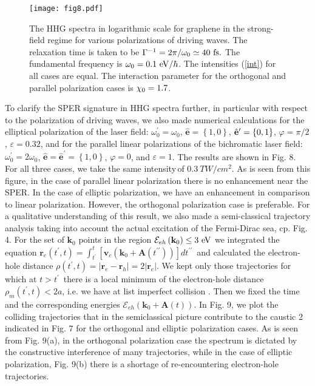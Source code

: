 \documentclass[reprint, superscriptaddress,  aps, pra]{revtex4-2}
\begin{document}
\begin{figure}[tbp]
\texttt{[image: fig8.pdf]}
\caption{The HHG spectra in logarithmic scale for graphene in the
strong-field regime for various polarizations of driving waves. The
relaxation time is taken to be $\Gamma ^{-1}=2\protect\pi /\protect\omega %
_{0}\simeq 40\ \mathrm{fs.}$ The fundamental frequency is $\protect\omega %
_{0}=0.1\ \mathrm{eV}/\hbar $. The intensities (\protect\ref{int}) for all
cases are equal. The interaction parameter for the orthogonal and parallel
polarization cases is $\protect\chi _{0}=1.7$. }
\end{figure}
To clarify the SPER signature in HHG spectra further, in particular with
respect to the polarization of driving waves, we also made numerical
calculations for the elliptical polarization of the laser field: $\omega
_{0}^{\prime }=\omega _{0}$, $\hat{\mathbf{e}}=\left\{ 1,0\right\} $, $\hat{%
\mathbf{e}}^{\prime }=\left\{ 0,1\right\} $, $\varphi =\pi /2$, $\varepsilon
=0.32$, and for the parallel linear polarizations of the bichromatic laser
field: $\omega _{0}^{\prime }=2\omega _{0}$, $\hat{\mathbf{e}}=\hat{\mathbf{e%
}}^{\prime }=\left\{ 1,0\right\} $, $\varphi =0$, and $\varepsilon =1$. The
results are shown in Fig. 8. For all three cases, we take the same intensity$%
\,$of \allowbreak $0.3\ TW/cm^{2}$. As is seen from this figure, in the case
of parallel linear polarization there is no enhancement near the SPER. In
the case of elliptic polarization, we have an enhancement in comparison to
linear polarization. However, the orthogonal polarization case is
preferable. For a qualitative understanding of this result, we also made a
semi-classical trajectory analysis taking into account the actual excitation
of the Fermi-Dirac sea, cp. Fig. 4. For the set of $\mathbf{k}_{0}$ points
in the region $\mathcal{E}_{eh}\left( \mathbf{k}_{0}\right) \leq 3\ \mathrm{%
eV}$ we integrated the equation $\mathbf{r}_{e}\left( t^{\prime },t\right)
=\int_{t^{\prime }}^{t}\left[ \mathbf{v}_{c}\left( \mathbf{k}_{0}+\mathbf{A}%
\left( t^{\prime \prime }\right) \right) \right] dt^{\prime \prime }$\ and
calculated the electron-hole distance $\rho \left( t^{\prime },t\right)
=\left\vert \mathbf{r}_{e}-\mathbf{r}_{h}\right\vert =2\left\vert \mathbf{r}%
_{e}\right\vert $. We kept only those trajectories for which at $t>t^{\prime
}$\ there is a local minimum of the electron-hole distance $\rho _{m}\left(
t^{\prime },t\right) <2a$, i.e. we have at list imperfect collision \cite%
{Gaarde}. Then we fixed the time and the corresponding energies $\mathcal{E}%
_{eh}\left( \mathbf{k}_{0}+\mathbf{A}\left( t\right) \right) $. In Fig. 9,
we plot the colliding trajectories that in the semiclassical picture
contribute to the caustic 2 indicated in Fig. 7 for the orthogonal and
elliptic polarization cases. As is seen from Fig. 9(a), in the orthogonal
polarization case the spectrum is dictated by the constructive interference
of many trajectories, while in the case of elliptic polarization, Fig. 9(b)
there is a shortage of re-encountering electron-hole trajectories.
\end{document}
